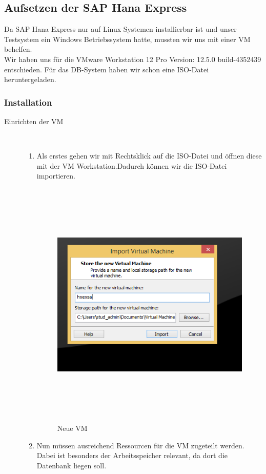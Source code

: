 \documentclass[a4paper, 12pt]{scrartcl}
\begin{document}
 
\subsection{Aufsetzen der SAP Hana Express}
Da SAP Hana Express nur auf Linux Systemen installierbar ist und unser Testsystem ein Windows Betriebssystem hatte, mussten wir uns mit einer VM behelfen.\\
Wir haben uns für die VMware Workstation 12 Pro Version: 12.5.0 build-4352439 entschieden. Für das DB-System haben wir schon eine ISO-Datei heruntergeladen.
\subsubsection{Installation}
\begin{description}
   \item[Einrichten der VM]~\par
   \begin{enumerate}
      \item Als erstes gehen wir mit Rechtsklick auf die ISO-Datei und öffnen diese mit der VM Workstation.Dadurch können wir die ISO-Datei importieren.
      
\begin{figure}[H]
\centering
\includegraphics[height=12cm, width=15cm, keepaspectratio]{Hana1.png}
\caption{Neue VM}
\end{figure}
     \newpage
      \item Nun müssen ausreichend Ressourcen für die VM zugeteilt werden. Dabei ist besonders der Arbeitsspeicher relevant, da dort die Datenbank liegen soll.
      

\end{enumerate}
\end{description}
\end{document}
